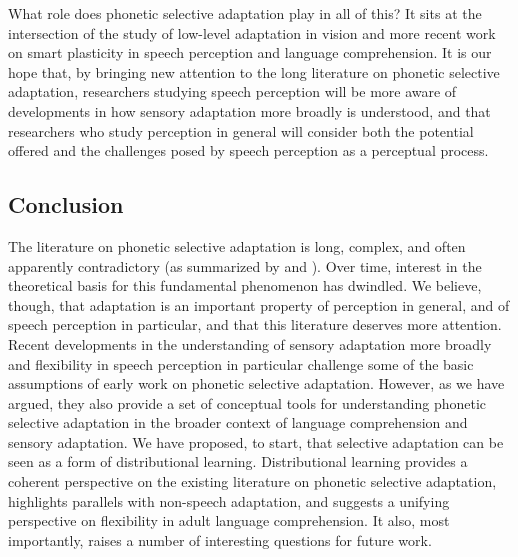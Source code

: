 What role does phonetic selective adaptation play in all of this?  It sits at the intersection of the study of low-level adaptation in vision and more recent work on smart plasticity in speech perception and language comprehension.  It is our hope that, by bringing new attention to the long literature on phonetic selective adaptation, researchers studying speech perception will be more aware of developments in how sensory adaptation more broadly is understood, and that researchers who study perception in general will consider both the potential offered and the challenges posed by speech perception as a perceptual process.

\subsection{Conclusion}
\label{sec:conclusion}

The literature on phonetic selective adaptation is long, complex, and often apparently contradictory (as summarized by  and ).  Over time, interest in the theoretical basis for this fundamental phenomenon has dwindled.  We believe, though, that adaptation is an important property of perception in general, and of speech perception in particular, and that this literature deserves more attention. Recent developments in the understanding of sensory adaptation more broadly and flexibility in speech perception in particular challenge some of the basic assumptions of early work on phonetic selective adaptation.  However, as we have argued, they also provide a set of conceptual tools for understanding phonetic selective adaptation in the broader context of language comprehension and sensory adaptation.  We have proposed, to start, that selective adaptation can be seen as a form of distributional learning.  Distributional learning provides a coherent perspective on the existing literature on phonetic selective adaptation, highlights parallels with non-speech adaptation, and suggests a unifying perspective on flexibility in adult language comprehension.  It also, most importantly, raises a number of interesting questions for future work.

